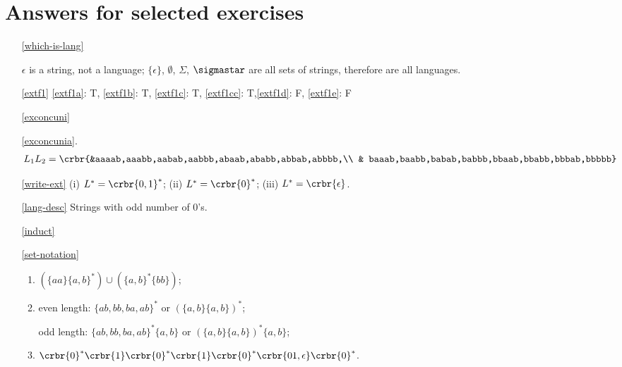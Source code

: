 \documentclass[11pt]{article}
\newcommand{\emptystring}{\ensuremath{\epsilon}}
\begin{document}
\section{Answers for selected exercises}
\begin{itemize}

\item[\ref{which-is-lang}] 

$\emptystring$ is a string, not a language; $\{\emptystring\}$,
$\emptyset$, $\Sigma$, $\sigmastar$ are all
sets of strings, therefore are all languages. 

\item[\ref{extf1}]\hypertarget{extf1sol}{} \ref{extf1a}: T, \ref{extf1b}: T, \ref{extf1c}: T, \ref{extf1cc}: T,\ref{extf1d}: F, \ref{extf1e}: F

\item[\ref{exconcuni}]\hypertarget{exconcunisol}{}

\ref{exconcunia}.
\begin{align*}
L_1L_2= \crbr{&aaaab,aaabb,aabab,aabbb,abaab,ababb,abbab,abbbb,\\
& baaab,baabb,babab,babbb,bbaab,bbabb,bbbab,bbbbb}
\end{align*}


\item[\ref{write-ext}] (i) $L^*= \crbr{0,1}^*$; (ii) $L^*=\crbr{0}^*$; (iii)
$L^*=\crbr{\epsilon}$.

\item[\ref{lang-desc}] Strings with odd number of 0's. 

\item[\ref{induct}]


\item[\ref{set-notation}]
\begin{enumerate}
\item  $(\{aa\}\{a,b\}^*)\cup(\{a,b\}^*\{bb\})$;


\item even length:
$\{ab,bb,ba,ab\}^*$ or $(\{a,b\}\{a,b\})^*$;

odd length:
$\{ab,bb,ba,ab\}^*\{a,b\}$ or $(\{a,b\}\{a,b\})^*\{a,b\}$;


\item $\crbr{0}^*\crbr{1}\crbr{0}^*\crbr{1}\crbr{0}^*\crbr{01,\epsilon}\crbr{0}^*$.


\end{enumerate}
\end{itemize}
\end{document}
